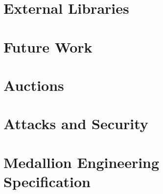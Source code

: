 \documentclass{article}
\begin{document}
    \section{External Libraries}
    \label{sec:external-libraries}
    

    
    \section{Future Work}
    \label{sec:future}
    

\newpage

\printbibliography

\newpage

\appendix

    \section{Auctions}
    \label{sec:auctions}
    

    \section{Attacks and Security}
    \label{sec:attacksappendix}
    

    \section{Medallion Engineering Specification}
    \label{medallionspow}
    
\end{document}
